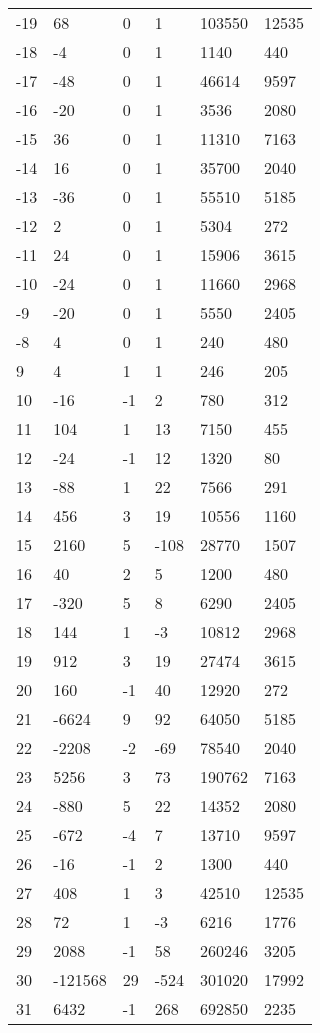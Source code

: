 \documentclass{amsart}
\begin{document}
\begin{longtable}{llllll}
-19 & 68 & 0 & 1 & 103550 & 12535\\
-18 & -4 & 0 & 1 & 1140 & 440\\
-17 & -48 & 0 & 1 & 46614 & 9597\\
-16 & -20 & 0 & 1 & 3536 & 2080\\
-15 & 36 & 0 & 1 & 11310 & 7163\\
-14 & 16 & 0 & 1 & 35700 & 2040\\
-13 & -36 & 0 & 1 & 55510 & 5185\\
-12 & 2 & 0 & 1 & 5304 & 272\\
-11 & 24 & 0 & 1 & 15906 & 3615\\
-10 & -24 & 0 & 1 & 11660 & 2968\\
-9 & -20 & 0 & 1 & 5550 & 2405\\
-8 & 4 & 0 & 1 & 240 & 480\\
9 & 4 & 1 & 1 & 246 & 205\\
10 & -16 & -1 & 2 & 780 & 312\\
11 & 104 & 1 & 13 & 7150 & 455\\
12 & -24 & -1 & 12 & 1320 & 80\\
13 & -88 & 1 & 22 & 7566 & 291\\
14 & 456 & 3 & 19 & 10556 & 1160\\
15 & 2160 & 5 & -108 & 28770 & 1507\\
16 & 40 & 2 & 5 & 1200 & 480\\
17 & -320 & 5 & 8 & 6290 & 2405\\
18 & 144 & 1 & -3 & 10812 & 2968\\
19 & 912 & 3 & 19 & 27474 & 3615\\
20 & 160 & -1 & 40 & 12920 & 272\\
21 & -6624 & 9 & 92 & 64050 & 5185\\
22 & -2208 & -2 & -69 & 78540 & 2040\\
23 & 5256 & 3 & 73 & 190762 & 7163\\
24 & -880 & 5 & 22 & 14352 & 2080\\
25 & -672 & -4 & 7 & 13710 & 9597\\
26 & -16 & -1 & 2 & 1300 & 440\\
27 & 408 & 1 & 3 & 42510 & 12535\\
28 & 72 & 1 & -3 & 6216 & 1776\\
29 & 2088 & -1 & 58 & 260246 & 3205\\
30 & -121568 & 29 & -524 & 301020 & 17992\\
31 & 6432 & -1 & 268 & 692850 & 2235\\

\end{longtable}
\end{document}
